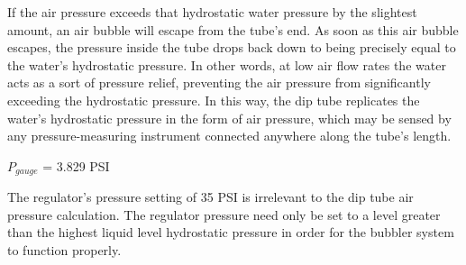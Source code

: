 If the air pressure exceeds that hydrostatic water pressure by the slightest amount, an air bubble will escape from the tube's end.  As soon as this air bubble escapes, the pressure inside the tube drops back down to being precisely equal to the water's hydrostatic pressure.  In other words, at low air flow rates the water acts as a sort of pressure relief, preventing the air pressure from significantly exceeding the hydrostatic pressure.  In this way, the dip tube replicates the water's hydrostatic pressure in the form of air pressure, which may be sensed by any pressure-measuring instrument connected anywhere along the tube's length.

\vskip 10pt

$P_{gauge}$ = 3.829 PSI







The regulator's pressure setting of 35 PSI is irrelevant to the dip tube air pressure calculation.  The regulator pressure need only be set to a level greater than the highest liquid level hydrostatic pressure in order for the bubbler system to function properly.




